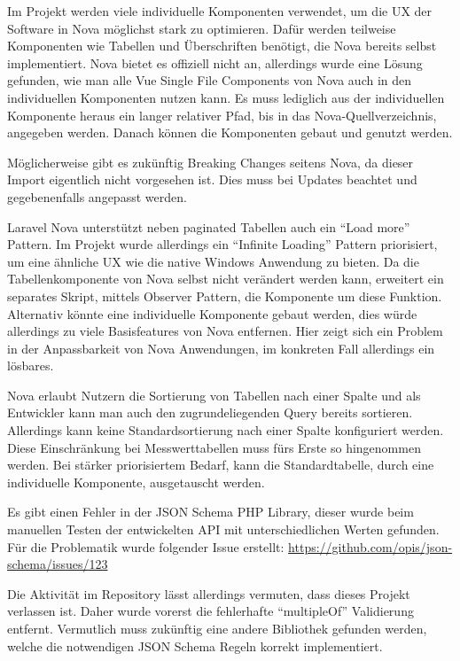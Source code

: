 Im Projekt werden viele individuelle Komponenten verwendet, um die UX der Software in Nova möglichst stark zu optimieren.
Dafür werden teilweise Komponenten wie Tabellen und Überschriften benötigt, die Nova bereits selbst implementiert.
Nova bietet es offiziell nicht an, allerdings wurde eine Lösung gefunden, wie man alle Vue Single File Components von Nova auch in den individuellen Komponenten nutzen kann.
Es muss lediglich aus der individuellen Komponente heraus ein langer relativer Pfad, bis in das Nova-Quellverzeichnis, angegeben werden.
Danach können die Komponenten gebaut und genutzt werden.

Möglicherweise gibt es zukünftig Breaking Changes seitens Nova, da dieser Import eigentlich nicht vorgesehen ist.
Dies muss bei Updates beachtet und gegebenenfalls angepasst werden.

\newpage

Laravel Nova unterstützt neben paginated Tabellen auch ein \enquote{Load more} Pattern.
Im Projekt wurde allerdings ein \enquote{Infinite Loading} Pattern priorisiert, um eine ähnliche UX wie die native Windows Anwendung zu bieten.
Da die Tabellenkomponente von Nova selbst nicht verändert werden kann, erweitert ein separates Skript, mittels Observer Pattern, die Komponente um diese Funktion.
Alternativ könnte eine individuelle Komponente gebaut werden, dies würde allerdings zu viele Basisfeatures von Nova entfernen.
Hier zeigt sich ein Problem in der Anpassbarkeit von Nova Anwendungen, im konkreten Fall allerdings ein lösbares.

Nova erlaubt Nutzern die Sortierung von Tabellen nach einer Spalte und als Entwickler kann man auch den zugrundeliegenden Query bereits sortieren.
Allerdings kann keine Standardsortierung nach einer Spalte konfiguriert werden.
Diese Einschränkung bei Messwerttabellen muss fürs Erste so hingenommen werden.
Bei stärker priorisiertem Bedarf, kann die Standardtabelle, durch eine individuelle Komponente, ausgetauscht werden.

Es gibt einen Fehler in der JSON Schema PHP Library, dieser wurde beim manuellen Testen der entwickelten API mit unterschiedlichen Werten gefunden.
Für die Problematik wurde folgender Issue erstellt: \url{https://github.com/opis/json-schema/issues/123}

Die Aktivität im Repository lässt allerdings vermuten, dass dieses Projekt verlassen ist.
Daher wurde vorerst die fehlerhafte \enquote{multipleOf} Validierung entfernt.
Vermutlich muss zukünftig eine andere Bibliothek gefunden werden, welche die notwendigen JSON Schema Regeln korrekt implementiert.
